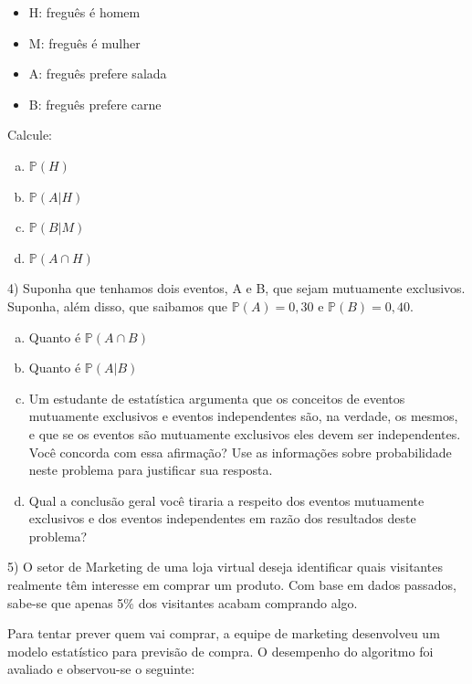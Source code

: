 \documentclass[12pt]{article}
\begin{document}
\begin{itemize}
    \item H: freguês é homem
    \item M: freguês é mulher
    \item A: freguês prefere salada
    \item B: freguês prefere carne
\end{itemize}

Calcule:

\begin{enumerate}[a)] %
    \item$ \mathds{P}(H)$
    \item $\mathds{P}(A|H)$
    \item $\mathds{P}(B|M)$
    \item $\mathds{P}(A \cap H)$
\end{enumerate}

\vspace{5px}

4) Suponha que tenhamos dois eventos, A e B, que sejam mutuamente exclusivos. Suponha, além disso, que saibamos que $\mathds{P}(A) = 0,30$ e $\mathds{P}(B) = 0,40$.

\begin{enumerate}[a)] %
    \item Quanto é $\mathds{P}(A \cap B)$
    \item Quanto é $\mathds{P}(A | B)$
    \item Um estudante de estatística argumenta que os conceitos de eventos mutuamente exclusivos e eventos independentes são, na verdade, os mesmos, e que se os eventos são mutuamente exclusivos eles devem ser independentes. Você concorda com essa afirmação? Use as informações sobre probabilidade neste problema para justificar sua resposta. 
    \item Qual a conclusão geral você tiraria a respeito dos eventos mutuamente exclusivos e dos eventos independentes em razão dos resultados deste problema?
\end{enumerate}

\vspace{5px}

5) O setor de Marketing de uma loja virtual deseja identificar quais visitantes realmente têm interesse em comprar um produto.  
Com base em dados passados, sabe-se que apenas 5\% dos visitantes acabam comprando algo.

Para tentar prever quem vai comprar, a equipe de marketing desenvolveu um modelo estatístico para previsão de compra.  
O desempenho do algoritmo foi avaliado e observou-se o seguinte:
\end{document}
